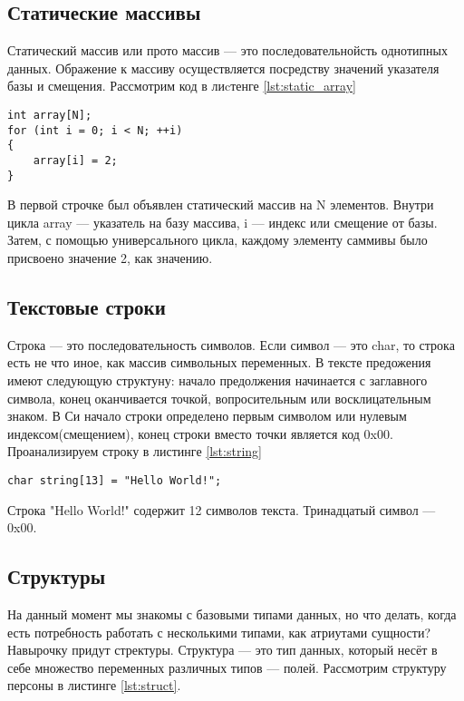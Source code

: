 \documentclass{bmstu}
\begin{document}

\subsection{Статические массивы}

Статический массив или прото массив --- это последовательнойсть однотипных данных.
Ображение к массиву осуществляется посредству значений указателя базы и смещения.
Рассмотрим код в лиcтенге \ref{lst:static_array}

\begin{lstlisting}[caption={Статический массив}, label={lst:static_array},]
int array[N];
for (int i = 0; i < N; ++i)
{
    array[i] = 2;
}
\end{lstlisting}

В первой строчке был объявлен статический массив на N элементов. 
Внутри цикла array --- указатель на базу массива, i --- индекс или смещение от базы.
Затем, с помощью универсального цикла, каждому элементу саммивы было присвоено значение 2, как значению.

\subsection{Текстовые строки}

Строка --- это последовательность символов.
Если символ --- это char, то строка есть не что иное, как массив символьных переменных.
В тексте предожения имеют следующую структуну: начало предолжения начинается с заглавного символа, конец оканчивается точкой, вопросительным или восклицательным знаком.
В Си начало строки определено первым символом или нулевым индексом(смещением), конец строки вместо точки является код 0x00.
Проанализируем строку в листинге \ref{lst:string}

\begin{lstlisting}[caption={Простейшая строка}, label={lst:string},]
char string[13] = "Hello World!";
\end{lstlisting}

Строка "Hello World!" содержит 12 символов текста. 
Тринадцатый символ --- 0x00.

\subsection{Структуры}

На данный момент мы знакомы с базовыми типами данных, но что делать, когда есть потребность работать с несколькими типами, как атриутами сущности?
Навырочку придут стректуры.
Структура --- это тип данных, который несёт в себе множество переменных различных типов --- полей.
Рассмотрим структуру персоны в листинге \ref{lst:struct}.
\end{document}
